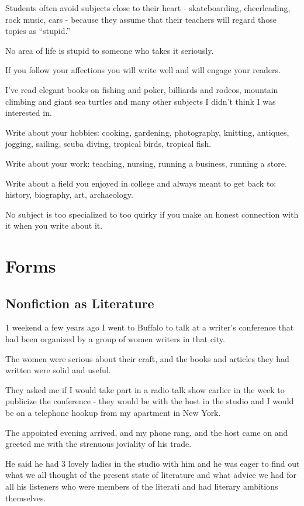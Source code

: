 \documentclass{book}
\numberwithin{equation}{section}
\begin{document}
Students often avoid subjects close to their heart - skateboarding, cheerleading, rock music, cars - because they assume that their teachers will regard those topics as ``stupid.''

No area of life is stupid to someone who takes it seriously.

If you follow your affections you will write well and will engage your readers.

%
I've read elegant books on fishing and poker, billiards and rodeos, mountain climbing and giant sea turtles and many other subjects I didn't think I was interested in.

Write about your hobbies: cooking, gardening, photography, knitting, antiques, jogging, sailing, scuba diving, tropical birds, tropical fish.

Write about your work: teaching, nursing, running a business, running a store.

Write about a field you enjoyed in college and always meant to get back to: history, biography, art, archaeology.

No subject is too specialized to too quirky if you make an honest connection with it when you write about it.


\part{Forms}

\chapter{Nonfiction as Literature}
1 weekend a few years ago I went to Buffalo to talk at a writer's conference that had been organized by a group of women writers in that city.

The women were serious about their craft, and the books and articles they had written were solid and useful.

They asked me if I would take part in a radio talk show earlier in the week to publicize the conference - they would be with the host in the studio and I would be on a telephone hookup from my apartment in New York.

%
The appointed evening arrived, and my phone rang, and the host came on and greeted me with the strenuous joviality of his trade.

He said he had 3 lovely ladies in the studio with him and he was eager to find out what we all thought of the present state of literature and what advice we had for all his listeners who were members of the literati and had literary ambitions themselves.
\end{document}
